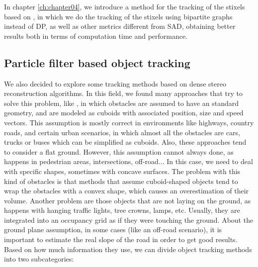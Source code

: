 In chapter \ref{ch:chapter04}, we introduce a method for the tracking of the stixels based on \cite{gunyel2012stixels}, in which we do the tracking of the stixels using bipartite graphs instead of \ac{DP}, as well as other metrics different from \ac{SAD}, obtaining better results both in terms of computation time and performance.

\subsection{Particle filter based object tracking}\label{ch:chapter00_02_05}

We also decided to explore some tracking methods based on dense stereo reconstruction algorithms. In this field, we found many approaches that try to solve this problem, like \cite{danescu2012particle}, in which obstacles are assumed to have an standard geometry, and are modeled as cuboids with associated position, size and speed vectors. This assumption is mostly correct in environments like highways, country roads, and certain urban scenarios, in which almost all the obstacles are cars, trucks or buses which can be simplified as cuboids. Also, these approaches tend to consider a flat ground.
However, this assumption cannot always done, as happens in pedestrian areas, intersections, off-road... In this case, we need to deal with specific shapes, sometimes with concave surfaces. The problem with this kind of obstacles is that methods that assume cuboid-shaped objects tend to wrap the obstacles with a convex shape, which causes an overestimation of their volume. Another problem are those objects that are not laying on the ground, as happens with hanging traffic lights, tree crowns, lamps, etc. Usually, they are integrated into an occupancy grid as if they were touching the ground. About the ground plane assumption, in some cases (like an off-road scenario), it is important to estimate the real slope of the road in order to get good results.
Based on how much information they use, we can divide object tracking methods into two subcategories:

